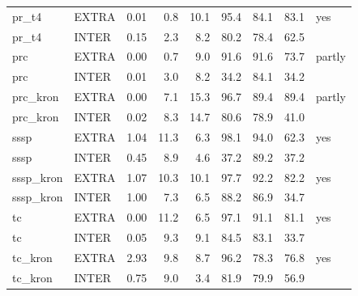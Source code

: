\begin{tabular}{llrrrrrrl}
\addlinespace[2pt]
pr\_t4 & EXTRA & 0.01 & 0.8 & 10.1 & 95.4 & 84.1 & 83.1 & yes \\
pr\_t4 & INTER & 0.15 & 2.3 & 8.2 & 80.2 & 78.4 & 62.5 &  \\
\addlinespace[2pt]
prc & EXTRA & 0.00 & 0.7 & 9.0 & 91.6 & 91.6 & 73.7 & partly \\
prc & INTER & 0.01 & 3.0 & 8.2 & 34.2 & 84.1 & 34.2 &  \\
\addlinespace[2pt]
prc\_kron & EXTRA & 0.00 & 7.1 & 15.3 & 96.7 & 89.4 & 89.4 & partly \\
prc\_kron & INTER & 0.02 & 8.3 & 14.7 & 80.6 & 78.9 & 41.0 &  \\
\addlinespace[2pt]
sssp & EXTRA & 1.04 & 11.3 & 6.3 & 98.1 & 94.0 & 62.3 & yes \\
sssp & INTER & 0.45 & 8.9 & 4.6 & 37.2 & 89.2 & 37.2 &  \\
\addlinespace[2pt]
sssp\_kron & EXTRA & 1.07 & 10.3 & 10.1 & 97.7 & 92.2 & 82.2 & yes \\
sssp\_kron & INTER & 1.00 & 7.3 & 6.5 & 88.2 & 86.9 & 34.7 &  \\
\addlinespace[2pt]
tc & EXTRA & 0.00 & 11.2 & 6.5 & 97.1 & 91.1 & 81.1 & yes \\
tc & INTER & 0.05 & 9.3 & 9.1 & 84.5 & 83.1 & 33.7 &  \\
\addlinespace[2pt]
tc\_kron & EXTRA & 2.93 & 9.8 & 8.7 & 96.2 & 78.3 & 76.8 & yes \\
tc\_kron & INTER & 0.75 & 9.0 & 3.4 & 81.9 & 79.9 & 56.9 &  \\
\bottomrule
\end{tabular}
